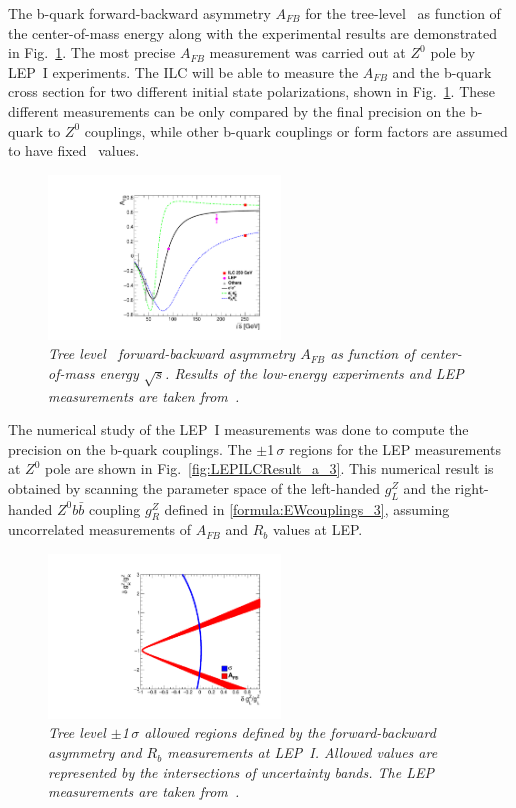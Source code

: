 The b-quark forward-backward asymmetry $A_{FB}$ for the tree-level \sm\ as function of the center-of-mass energy along with the experimental results are demonstrated in Fig.~\ref{fig:LEPILC_3}. 
The most precise $A_{FB}$ measurement was carried out at $Z^0$ pole by LEP~I experiments. 
The ILC will be able to measure the $A_{FB}$ and the b-quark cross section for two different initial state polarizations, shown in  Fig.~\ref{fig:LEPILC_3}. 
These different measurements can be only compared by the final precision on the b-quark to $Z^0$ couplings, while other b-quark couplings or form factors are assumed to have fixed \sm\ values. 
\begin{figure}
	{\centering
		\includegraphics[width=0.55\textwidth]{ILD/plots/afb-sqrts.pdf}
		\caption{\sl Tree level \sm\ forward-backward asymmetry $A_{FB}$ as function of center-of-mass energy $\sqrt{s}$.  Results of the low-energy experiments and LEP measurements are taken from~\cite{bib:LEPpuzzle}. 
		}
		\label{fig:LEPILC_3}
	}
	
\end{figure}
The numerical study of the LEP~I measurements was done to compute the precision on the b-quark couplings. 
The $\pm$1\,$\sigma$ regions for the LEP measurements at $Z^0$ pole are shown in Fig.~\ref{fig:LEPILCResult_a_3}. 
This numerical result is obtained by scanning the parameter space of the left-handed $g^Z_L$ and the right-handed $Z^0b\bar{b}$ coupling $g^Z_R$ defined in \ref{formula:EWcouplings_3}, assuming uncorrelated measurements of $A_{FB}$ and $R_b$ values at LEP. 
\begin{figure}
	{\centering
		\includegraphics[width=0.55\textwidth]{ILD/plots/lep-result-full.pdf}
		\caption{\sl  Tree level $\pm$1\,$\sigma$ allowed regions defined by the forward-backward asymmetry and $R_b$ measurements at LEP~I. Allowed values are represented by the intersections of uncertainty bands. The LEP measurements are taken from~\cite{bib:LEPpuzzle}. 
		}
		\label{fig:LEPResultFull_3}
	}
	
\end{figure}
